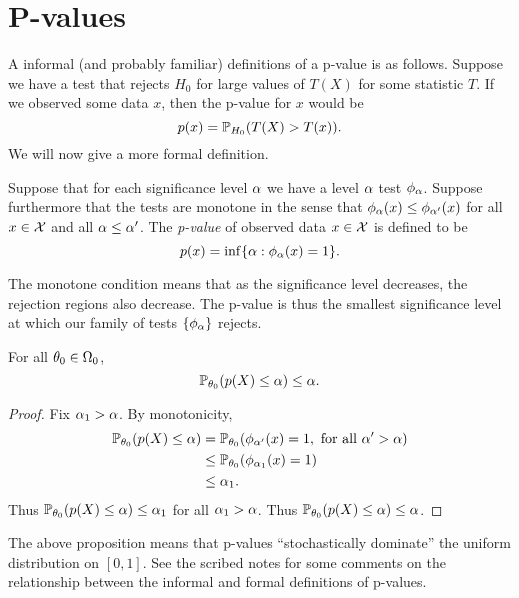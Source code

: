 \section{P-values}
A informal (and probably familiar) definitions of a p-value is as follows. Suppose we have a test that rejects $H_0$ for large values of $T(X)$ for some statistic $T$. If we observed some data $x$, then the p-value for $x$ would be
\[p(x)= {\mathbb{P}}_{H_0}(T(X) > T(x)). \]
We will now give a more formal definition.
\begin{defn}
    Suppose that for each significance level ${\alpha}$ we have a level ${\alpha}$ test $\phi_{\alpha}$. Suppose furthermore that the tests are monotone in the sense that $\phi_{\alpha}(x) \le \phi_{{\alpha}'}(x)$ for all $x \in {\mathcal{X}}$ and all ${\alpha} \le {\alpha}'$. The \emph{p-value} of observed data $x \in {\mathcal{X}}$ is defined to be 
    \[p(x) = \inf\{{\alpha} : \phi_{{\alpha}}(x)=1\}. \]
\end{defn}
The monotone condition means that as the significance level decreases, the rejection regions also decrease. The p-value is thus the smallest significance level at which our family of tests $\{\phi_{\alpha}\}$ rejects. 
\begin{prop}
    For all ${\theta}_0 \in {{\Omega}}_0$,
    \[{\mathbb{P}}_{{\theta}_0}(p(X) \le {\alpha}) \le {\alpha}. \]
\end{prop}
\begin{proof}
    Fix ${\alpha}_1 > {\alpha}$.  By monotonicity,
    \begin{align*}
        {\mathbb{P}}_{{\theta}_0}(p(X) \le {\alpha}) &= {\mathbb{P}}_{{\theta}_0}(\phi_{{\alpha}'}(x)=1, \text{ for all } {\alpha}'>{\alpha})\\
        &\le {\mathbb{P}}_{{\theta}_0}(\phi_{{\alpha}_1}(x)=1)\\
        &\le {\alpha}_1.
    \end{align*}
    Thus ${\mathbb{P}}_{{\theta}_0}(p(X) \le {\alpha}) \le {\alpha}_1$ for all ${\alpha}_1 > {\alpha}$. Thus ${\mathbb{P}}_{{\theta}_0}(p(X) \le {\alpha})\le {\alpha}$. 
\end{proof}
The above proposition means that p-values ``stochastically dominate'' the uniform distribution on $[0,1]$. See the scribed notes for some comments on the relationship between the informal and formal definitions of p-values.
